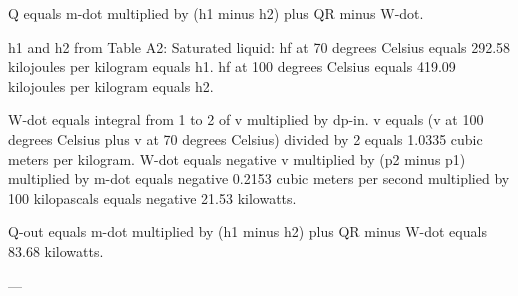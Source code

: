 Q equals m-dot multiplied by (h1 minus h2) plus QR minus W-dot.  

h1 and h2 from Table A2:  
Saturated liquid:  
hf at 70 degrees Celsius equals 292.58 kilojoules per kilogram equals h1.  
hf at 100 degrees Celsius equals 419.09 kilojoules per kilogram equals h2.  

W-dot equals integral from 1 to 2 of v multiplied by dp-in.  
v equals (v at 100 degrees Celsius plus v at 70 degrees Celsius) divided by 2 equals 1.0335 cubic meters per kilogram.  
W-dot equals negative v multiplied by (p2 minus p1) multiplied by m-dot equals negative 0.2153 cubic meters per second multiplied by 100 kilopascals equals negative 21.53 kilowatts.  

Q-out equals m-dot multiplied by (h1 minus h2) plus QR minus W-dot equals 83.68 kilowatts.  

---